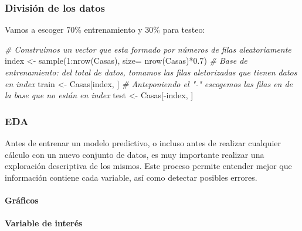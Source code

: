 \documentclass[
]{article}
\newenvironment{Shaded}{\begin{snugshade}}{\end{snugshade}}
\newcommand{\AttributeTok}[1]{\textcolor[rgb]{0.77,0.63,0.00}{#1}}
\newcommand{\CommentTok}[1]{\textcolor[rgb]{0.56,0.35,0.01}{\textit{#1}}}
\newcommand{\DecValTok}[1]{\textcolor[rgb]{0.00,0.00,0.81}{#1}}
\newcommand{\FloatTok}[1]{\textcolor[rgb]{0.00,0.00,0.81}{#1}}
\newcommand{\FunctionTok}[1]{\textcolor[rgb]{0.00,0.00,0.00}{#1}}
\newcommand{\NormalTok}[1]{#1}
\newcommand{\OtherTok}[1]{\textcolor[rgb]{0.56,0.35,0.01}{#1}}
\newcommand{\SpecialCharTok}[1]{\textcolor[rgb]{0.00,0.00,0.00}{#1}}
\begin{document}
\hypertarget{divisiuxf3n-de-los-datos-1}{%
\subsubsection{División de los datos}\label{divisiuxf3n-de-los-datos-1}}

Vamos a escoger 70\% entrenamiento y 30\% para testeo:

\begin{Shaded}
\begin{Highlighting}[]
\CommentTok{\# Construimos un vector que esta formado por números de filas aleatoriamente}
\NormalTok{index }\OtherTok{\textless{}{-}} \FunctionTok{sample}\NormalTok{(}\DecValTok{1}\SpecialCharTok{:}\FunctionTok{nrow}\NormalTok{(Casas), }\AttributeTok{size=} \FunctionTok{nrow}\NormalTok{(Casas)}\SpecialCharTok{*}\FloatTok{0.7}\NormalTok{)}
\CommentTok{\# Base de entrenamiento: del total de datos, tomamos las filas aletorizadas que tienen datos en index}
\NormalTok{train }\OtherTok{\textless{}{-}}\NormalTok{ Casas[index, ]}
\CommentTok{\# Anteponiendo el "{-}" escogemos las filas en de la base que no están en index }
\NormalTok{test  }\OtherTok{\textless{}{-}}\NormalTok{ Casas[}\SpecialCharTok{{-}}\NormalTok{index, ]}
\end{Highlighting}
\end{Shaded}

\hypertarget{eda}{%
\subsubsection{EDA}\label{eda}}

Antes de entrenar un modelo predictivo, o incluso antes de realizar
cualquier cálculo con un nuevo conjunto de datos, es muy importante
realizar una exploración descriptiva de los mismos. Este proceso permite
entender mejor que información contiene cada variable, así como detectar
posibles errores.

\hypertarget{gruxe1ficos}{%
\paragraph{Gráficos}\label{gruxe1ficos}}

\hypertarget{variable-de-interuxe9s}{%
\paragraph{Variable de interés}\label{variable-de-interuxe9s}}
\end{document}
